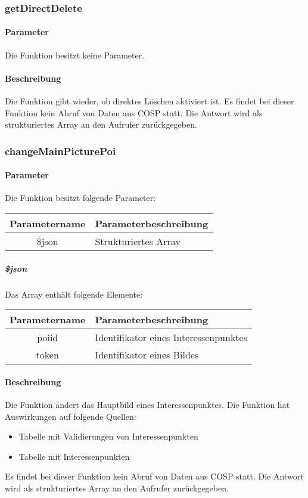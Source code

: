\subsubsection{getDirectDelete}
\paragraph{Parameter} Die Funktion besitzt keine Parameter.
\paragraph{Beschreibung} Die Funktion gibt wieder, ob direktes Löschen aktiviert ist. Es findet bei dieser Funktion kein Abruf von Daten aus {\glqq COSP\grqq} statt. Die Antwort wird als strukturiertes Array an den Aufrufer zurückgegeben.
\subsubsection{changeMainPicturePoi}
\paragraph{Parameter} Die Funktion besitzt folgende Parameter:
\begin{table}[H]
	\begin{tabular}{|c|p{11cm}|}
		\hline
		\textbf{Parametername} & \textbf{Parameterbeschreibung} \\ \hline
		\$json & Strukturiertes Array \\ \hline
	\end{tabular}
\end{table}
\subparagraph{\$json}Das Array enthält folgende Elemente:
\begin{table}[H]
	\begin{tabular}{|c|p{11cm}|}
		\hline
		\textbf{Parametername} & \textbf{Parameterbeschreibung} \\ \hline
		poiid & Identifikator eines Interessenpunktes \\ \hline
		token & Identifikator eines Bildes \\ \hline
	\end{tabular}
\end{table}
\paragraph{Beschreibung} Die Funktion ändert das Hauptbild eines Interessenpunktes. Die Funktion hat Auswirkungen auf folgende Quellen:
\begin{itemize}
	\item Tabelle mit Validierungen von Interessenpunkten
	\item Tabelle mit Interessenpunkten
\end{itemize}
Es findet bei dieser Funktion kein Abruf von Daten aus {\glqq COSP\grqq} statt. Die Antwort wird als strukturiertes Array an den Aufrufer zurückgegeben.
